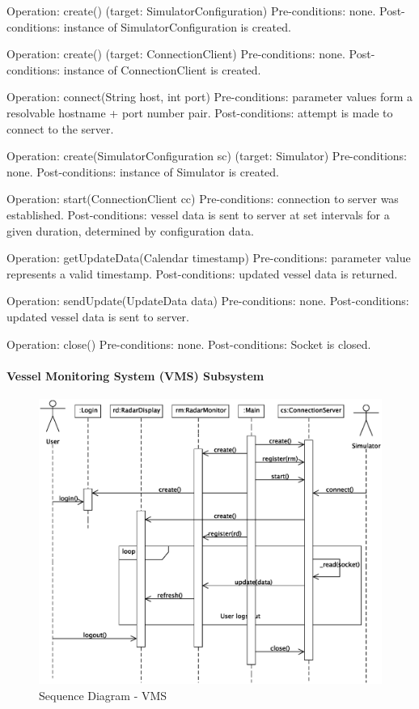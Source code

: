 \documentclass{article}
\begin{document}
Operation: create() (target: SimulatorConfiguration)
Pre-conditions: none.
Post-conditions: instance of SimulatorConfiguration is created.

Operation: create() (target: ConnectionClient)
Pre-conditions: none.
Post-conditions: instance of ConnectionClient is created.

Operation: connect(String host, int port)
Pre-conditions: parameter values form a resolvable hostname + port number pair.
Post-conditions: attempt is made to connect to the server.

Operation: create(SimulatorConfiguration sc) (target: Simulator)
Pre-conditions: none.
Post-conditions: instance of Simulator is created.

Operation: start(ConnectionClient cc)
Pre-conditions: connection to server was established.
Post-conditions: vessel data is sent to server at set intervals for a given duration, determined by configuration data.

Operation: getUpdateData(Calendar timestamp)
Pre-conditions: parameter value represents a valid timestamp.
Post-conditions: updated vessel data is returned.

Operation: sendUpdate(UpdateData data)
Pre-conditions: none.
Post-conditions: updated vessel data is sent to server.

Operation: close()
Pre-conditions: none.
Post-conditions: Socket is closed.

\paragraph{Vessel Monitoring System (VMS) Subsystem}

\begin{figure}[!htb]
\caption{Sequence Diagram - VMS}
\centering
\includegraphics[scale=0.6]{diagrams/vms-sequence-diagram.eps}
\end{figure}
\end{document}
